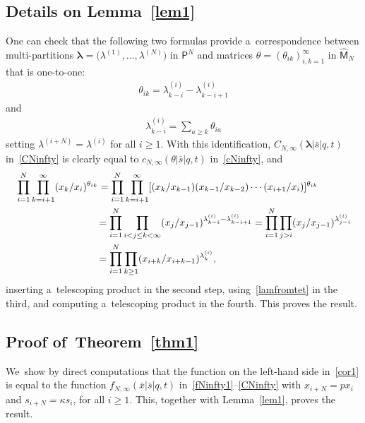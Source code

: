 \documentclass[pdftex]{sigma}%
\numberwithin{equation}{section}
\newcommand{\vlam}{\boldsymbol{\lambda}}
\newcommand{\bx}{\bar{x}}
\newcommand{\bs}{\bar{s}}
\begin{document}
\subsection[Details on Lemma~3.5]{Details on Lemma~\ref{lem1}}\label{app:prooflem1}
One can check that the following two formulas provide a~correspondence between multi-partitions $\vlam=\big(\lambda^{(1)},\dots,\lambda^{(N)}\big)$ in $\mathsf{P}^N$ and matrices $\theta=(\theta_{ik})_{i,k=1}^\infty$ in $\hat{\mathsf{M}}_N$ that is one-to-one:
\begin{gather*}
\theta_{ik} = \lambda^{(i)}_{k-i}-\lambda^{(i)}_{k-i+1}
\end{gather*}
and
\begin{gather}\label{lamfromtet}
\lambda^{(i)}_{k-i} = \sum_{a\geq k}\theta_{ia}
\end{gather}
setting $\lambda^{(i+N)}=\lambda^{(i)}$ for all $i\geq 1$. With this identification, $C_{N,\infty}(\vlam|\bs|q,t)$ in~\eqref{CNinfty} is clearly equal to $c_{N,\infty}(\theta|\bs|q,t)$ in~\eqref{cNinfty}, and
\begin{gather*}
\begin{split}
&\prod_{i=1}^N \prod_{k=i+1}^\infty (x_k/x_i)^{\theta_{ik}} = \prod_{i=1}^N \prod_{k=i+1}^\infty [(x_k/x_{k-1})(x_{k-1}/x_{k-2})\cdots (x_{i+1}/x_i)]^{\theta_{ik}}
\\ &\hphantom{\prod_{i=1}^N \prod_{k=i+1}^\infty (x_k/x_i)^{\theta_{ik}}}
{}= \prod_{i=1}^N \prod_{i<j\leq k<\infty} (x_j/x_{j-1})^{ \lambda^{(i)}_{k-i}-\lambda^{(i)}_{k-i+1}}
 = \prod_{i=1}^N \prod_{j>i} (x_j/x_{j-1})^{\lambda^{(i)}_{j-i}}
\\ &\hphantom{\prod_{i=1}^N \prod_{k=i+1}^\infty (x_k/x_i)^{\theta_{ik}}}
{}= \prod_{i=1}^N \prod_{k\geq 1}(x_{i+k}/x_{i+k-1})^{\lambda^{(i)}_k},
\end{split}
\end{gather*}
inserting a~telescoping product in the second step, using~\eqref{lamfromtet} in the third, and computing a~telescoping product in the fourth. This proves the result.

\subsection[Proof of~Theorem~3.2]{Proof of~Theorem~\ref{thm1}}
\label{app:proofprop1}
We~show by direct computations that the function on the left-hand side in~\eqref{cor1} is equal to the function $f_{N,\infty}(\bx|\bs|q,t)$ in~\eqref{fNinfty1}--\eqref{CNinfty} with $x_{i+N}=px_i$ and $s_{i+N}=\kappa s_i$, for all $i\geq 1$.
This, together with Lemma~\ref{lem1}, proves the result.
\end{document}
